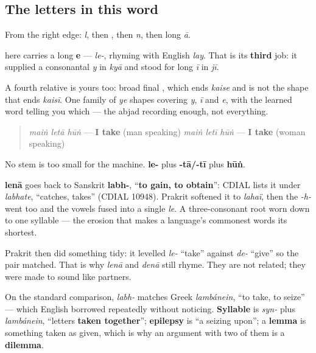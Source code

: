 \subsection*{The letters in this word}
From the right edge: \textbf{} \emph{l}, then \textbf{}, then \textbf{} \emph{n}, then \textbf{} long \emph{ā}.

\textbf{} here carries a long \textbf{e} — \emph{le-}, rhyming with English \emph{lay}. That is its \textbf{third} job: it supplied a consonantal \emph{y} in \textbf{} \emph{kyā} and stood for long \emph{ī} in \emph{jī}.

A fourth relative is yours too: broad final \textbf{}, which ends \textbf{} \emph{kaise} and is not the shape that ends \textbf{} \emph{kaisī}. One family of \emph{ye} shapes covering \emph{y}, \emph{ī} and \emph{e}, with the learned word telling you which — the abjad recording enough, not everything.

\begin{grammarlens}[title={Grammar Lens: a two-letter stem in the same frame}]
\begin{quote}
\emph{maiṅ letā hūṅ} — \textbf{I take} (man speaking) \emph{maiṅ letī hūṅ} — \textbf{I take} (woman speaking)
\end{quote}

No stem is too small for the machine. \textbf{le-} plus \textbf{-tā/-tī} plus \textbf{hūṅ}.
\end{grammarlens}

\begin{cousinweb}
\textbf{lenā} goes back to Sanskrit \textbf{labh-}, “\textbf{to gain, to obtain}”: CDIAL lists it under \emph{labhate}, “catches, takes” (CDIAL 10948). Prakrit softened it to \emph{lahaï}, then the \emph{-h-} went too and the vowels fused into a single \emph{le}. A three-consonant root worn down to one syllable — the erosion that makes a language's commonest words its shortest.

Prakrit then did something tidy: it levelled \emph{le-} “take” against \emph{de-} “give” so the pair matched. That is why \textbf{} \emph{lenā} and \emph{denā} still rhyme. They are not related; they were made to sound like partners.

On the standard comparison, \emph{labh-} matches Greek \emph{lambánein}, “to take, to seize” — which English borrowed repeatedly without noticing. \textbf{Syllable} is \emph{syn-} plus \emph{lambánein}, “letters \textbf{taken together}”; \textbf{epilepsy} is “a seizing upon”; a \textbf{lemma} is something taken as given, which is why an argument with two of them is a \textbf{dilemma}.
\end{cousinweb}

